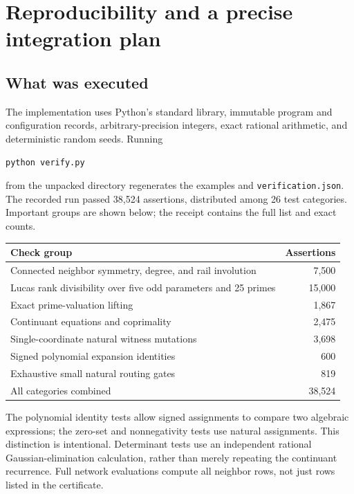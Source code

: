 \documentclass[11pt,letterpaper]{article}
\theoremstyle{definition}
\theoremstyle{remark}
\begin{document}
\section{Reproducibility and a precise integration plan}
\label{ste:wc:sec:verification}

\subsection{What was executed}
The implementation uses Python's standard library, immutable program and
configuration records, arbitrary-precision integers, exact rational
arithmetic, and deterministic random seeds. Running
\begin{lstlisting}
python verify.py
\end{lstlisting}
from the unpacked directory regenerates the examples and
\texttt{verification.json}. The recorded run passed 38,524 assertions,
distributed among 26 test categories. Important groups are shown below;
the receipt contains the full list and exact counts.
\begin{center}
\begin{tabularx}{\linewidth}{@{}Xr@{}}
\toprule
Check group&Assertions\\
\midrule
Connected neighbor symmetry, degree, and rail involution&7,500\\
Lucas rank divisibility over five odd parameters and 25 primes&15,000\\
Exact prime-valuation lifting&1,867\\
Continuant equations and coprimality&2,475\\
Single-coordinate natural witness mutations&3,698\\
Signed polynomial expansion identities&600\\
Exhaustive small natural routing gates&819\\
All categories combined&38,524\\
\bottomrule
\end{tabularx}
\end{center}

The polynomial identity tests allow signed assignments to compare two
algebraic expressions; the zero-set and nonnegativity tests use natural
assignments. This distinction is intentional. Determinant tests use an
independent rational Gaussian-elimination calculation, rather than merely
repeating the continuant recurrence. Full network evaluations compute all
neighbor rows, not just rows listed in the certificate.
\end{document}

